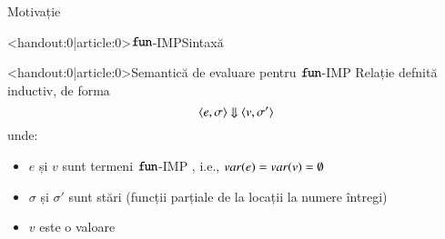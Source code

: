 
\begin{section}{Motivație}
\begin{frame}<handout:0|article:0>{$\mathrel{\text{\ttfamily fun}}$-IMP}{Sintaxă}
\vspace{-5ex}
\end{frame}

\begin{frame}<handout:0|article:0>{Semantică de evaluare pentru $\mathrel{\text{\ttfamily fun}}$-IMP}
 Relație defnită inductiv, de forma 
\[ \displaystyle{\ensuremath {{\langle{e,\sigma}\rangle}} \Downarrow {{\ensuremath \langle{v,\sigma'}\rangle}}}\]
unde:
\begin{itemize}
\item $e$ și $v$ sunt termeni $\mathrel{\text{\ttfamily fun}}$-IMP , i.e., $\mathop{var}(e) = \mathop{var}(v) = \emptyset$
\item $\sigma$ și $\sigma'$ sunt stări (funcții parțiale de la locații la numere întregi)
\item $v$ este o valoare 
\begin{syntaxBlock}{}
\renewcommand{\syntaxKeyword}{}
\end{syntaxBlock}
\end{itemize}


\end{frame}
\end{section}
